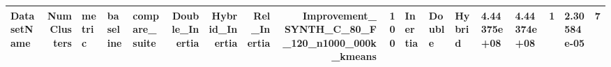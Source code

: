 \begin{tabular}{lrlllrrrrr}
\toprule
DatasetName & NumClusters & metric & baseline & compare_suite & Double_Inertia & Hybrid_Inertia & Rel_Inertia & Improvement_%
\midrule
SYNTH_C_80_F_120_n1000_000k_kmeans & 100 & Inertia & Double & Hybrid & 4.44375e+08 & 4.44374e+08 & 1 & 2.30584e-05 & 7 \\
\bottomrule
\end{tabular}
